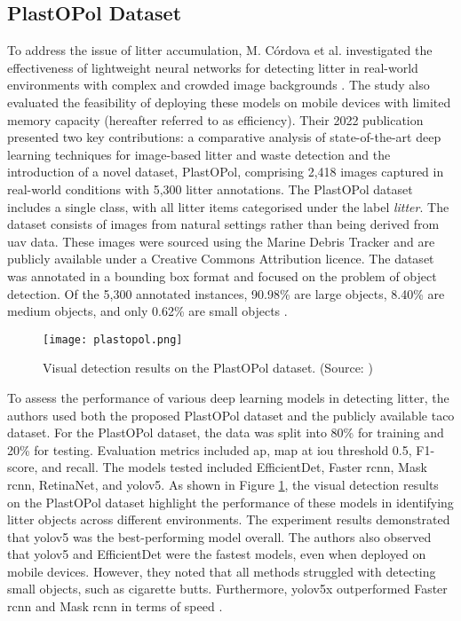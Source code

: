 \subsection{PlastOPol Dataset}
\label{subsec:3_plastopol}

To address the issue of litter accumulation, M. Córdova et al. investigated the effectiveness of lightweight neural networks for detecting litter in real-world environments with complex and crowded image backgrounds \cite{plastopol}. The study also evaluated the feasibility of deploying these models on mobile devices with limited memory capacity (hereafter referred to as efficiency). Their 2022 publication presented two key contributions: a comparative analysis of state-of-the-art deep learning techniques for image-based litter and waste detection and the introduction of a novel dataset, PlastOPol, comprising 2,418 images captured in real-world conditions with 5,300 litter annotations.
The PlastOPol dataset includes a single class, with all litter items categorised under the label \textit{litter}. The dataset consists of images from natural settings rather than being derived from \gls{uav} data. These images were sourced using the Marine Debris Tracker and are publicly available under a Creative Commons Attribution licence. The dataset was annotated in a bounding box format and focused on the problem of object detection. Of the 5,300 annotated instances, 90.98\% are large objects, 8.40\% are medium objects, and only 0.62\% are small objects \cite{plastopol}.

\begin{figure}[!htbp]
    \centering
    \texttt{[image: plastopol.png]}
    \caption{Visual detection results on the PlastOPol dataset. (Source: \cite{plastopol})}
    \label{fig:plastopol}
\end{figure}

To assess the performance of various deep learning models in detecting litter, the authors used both the proposed PlastOPol dataset and the publicly available \gls{taco} dataset. For the PlastOPol dataset, the data was split into 80\% for training and 20\% for testing. Evaluation metrics included \gls{ap}, \gls{map} at \gls{iou} threshold 0.5, F1-score, and recall. The models tested included EfficientDet, Faster \gls{rcnn}, Mask \gls{rcnn}, RetinaNet, and \gls{yolo}v5. As shown in Figure \ref{fig:plastopol}, the visual detection results on the PlastOPol dataset highlight the performance of these models in identifying litter objects across different environments.
The experiment results demonstrated that \gls{yolo}v5 was the best-performing model overall. The authors also observed that \gls{yolo}v5 and EfficientDet were the fastest models, even when deployed on mobile devices. However, they noted that all methods struggled with detecting small objects, such as cigarette butts. Furthermore, \gls{yolo}v5x outperformed Faster \gls{rcnn} and Mask \gls{rcnn} in terms of speed \cite{plastopol}.

